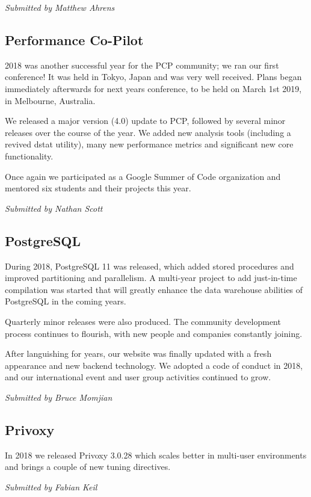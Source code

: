 \documentclass[a4paper]{report}
\begin{document}
{\em Submitted by Matthew Ahrens}

\subsection{Performance Co-Pilot}

2018 was another successful year for the PCP community; we ran our first
conference! It was held in Tokyo, Japan and was very well received.
Plans began immediately afterwards for next years conference, to be held
on March 1st 2019, in Melbourne, Australia.

We released a major version (4.0) update to PCP, followed by several
minor releases over the course of the year.  We added new analysis tools
(including a revived dstat utility), many new performance metrics and
significant new core functionality.

Once again we participated as a Google Summer of Code organization and
mentored six students and their projects this year.

{\em Submitted by Nathan Scott}

\subsection{PostgreSQL}

During 2018, PostgreSQL 11 was released, which added stored procedures
and improved partitioning and parallelism.  A multi-year project to add
just-in-time compilation was started that will greatly enhance the data
warehouse abilities of PostgreSQL in the coming years.

Quarterly minor releases were also produced.  The community development
process continues to flourish, with new people and companies constantly
joining.

After languishing for years, our website was finally updated with a
fresh appearance and new backend technology.  We adopted a code of
conduct in 2018, and our international event and user group activities
continued to grow.

{\em Submitted by Bruce Momjian}

\subsection{Privoxy}

In 2018 we released Privoxy 3.0.28 which scales better in multi-user
environments and brings a couple of new tuning directives.

{\em Submitted by Fabian Keil}
\end{document}
